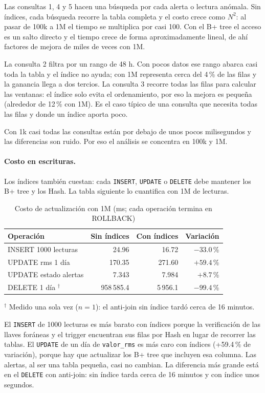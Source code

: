 Las consultas 1, 4 y 5 hacen una búsqueda por cada alerta o lectura anómala.
Sin índices, cada búsqueda recorre la tabla completa y el costo crece como
$N^2$: al pasar de 100k a 1M el tiempo se multiplica por casi 100. Con el B+
tree el acceso es un salto directo y el tiempo crece de forma aproximadamente
lineal, de ahí factores de mejora de miles de veces con 1M.

La consulta 2 filtra por un rango de 48 h. Con pocos datos ese rango abarca casi
toda la tabla y el índice no ayuda; con 1M representa cerca del 4\,\% de las
filas y la ganancia llega a dos tercios. La consulta 3 recorre todas las filas
para calcular las ventanas: el índice solo evita el ordenamiento, por eso la
mejora es pequeña (alrededor de 12\,\% con 1M). Es el caso típico de una
consulta que necesita todas las filas y donde un índice aporta poco.

Con 1k casi todas las consultas están por debajo de unos pocos milisegundos y
las diferencias son ruido. Por eso el análisis se concentra en 100k y 1M.

\paragraph{Costo en escrituras.}
Los índices también cuestan: cada \texttt{INSERT}, \texttt{UPDATE} o
\texttt{DELETE} debe mantener los B+ tree y los Hash. La tabla siguiente lo
cuantifica con 1M de lecturas.

\begin{table}[H]
\centering
\small
\caption{Costo de actualización con 1M (ms; cada operación termina en ROLLBACK)}
\begin{tabular}{|l|r|r|r|}
\hline
\textbf{Operación} & \textbf{Sin índices} & \textbf{Con índices} & \textbf{Variación} \\ \hline
INSERT 1000 lecturas & 24.96 & 16.72 & $-33.0$\,\% \\ \hline
UPDATE rms 1 día & 170.35 & 271.60 & $+59.4$\,\% \\ \hline
UPDATE estado alertas & 7.343 & 7.984 & $+8.7$\,\% \\ \hline
DELETE 1 día $^{\dagger}$ & 958\,585.4 & 5\,956.1 & $-99.4$\,\% \\ \hline
\end{tabular}
\par\footnotesize $^{\dagger}$ Medido una sola vez ($n=1$): el anti-join sin índice tardó cerca de 16 minutos.
\end{table}


El \texttt{INSERT} de 1000 lecturas es más barato con índices porque la
verificación de las llaves foráneas y el trigger encuentran sus filas por Hash
en lugar de recorrer las tablas. El \texttt{UPDATE} de un día de
\texttt{valor\_rms} es más caro con índices (+59.4\,\% de variación), porque hay que
actualizar los B+ tree que incluyen esa columna. Las alertas, al ser una tabla
pequeña, casi no cambian. La diferencia más grande está en el \texttt{DELETE}
con anti-join: sin índice tarda cerca de 16 minutos y con índice unos segundos.

